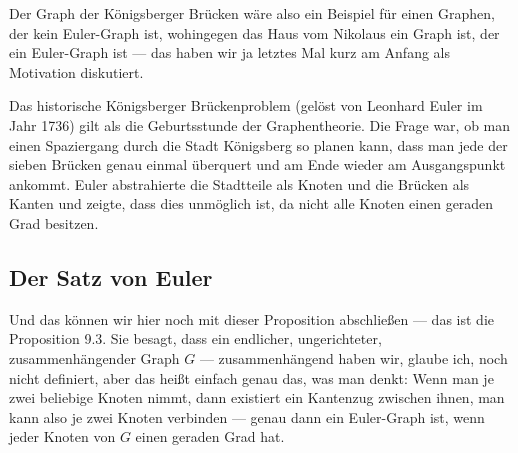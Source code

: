 \begin{spoken-clean}[00:05:40 - 00:06:45]
Der Graph der Königsberger Brücken wäre also ein Beispiel für einen Graphen, der kein Euler-Graph ist, wohingegen das Haus vom Nikolaus ein Graph ist, der ein Euler-Graph ist --- das haben wir ja letztes Mal kurz am Anfang als Motivation diskutiert.
\end{spoken-clean}

\begin{didactic-insight}
Das historische Königsberger Brückenproblem (gelöst von Leonhard Euler im Jahr 1736) gilt als die Geburtsstunde der Graphentheorie. Die Frage war, ob man einen Spaziergang durch die Stadt Königsberg so planen kann, dass man jede der sieben Brücken genau einmal überquert und am Ende wieder am Ausgangspunkt ankommt. Euler abstrahierte die Stadtteile als Knoten und die Brücken als Kanten und zeigte, dass dies unmöglich ist, da nicht alle Knoten einen geraden Grad besitzen.
\end{didactic-insight}

\subsection{Der Satz von Euler}

\begin{spoken-clean}[00:06:45 - 00:08:55]
Und das können wir hier noch mit dieser Proposition abschließen --- das ist die Proposition 9.3. Sie besagt, dass ein endlicher, ungerichteter, zusammenhängender Graph $G$ --- zusammenhängend haben wir, glaube ich, noch nicht definiert, aber das heißt einfach genau das, was man denkt: Wenn man je zwei beliebige Knoten nimmt, dann existiert ein Kantenzug zwischen ihnen, man kann also je zwei Knoten verbinden --- genau dann ein Euler-Graph ist, wenn jeder Knoten von $G$ einen geraden Grad hat.
\end{spoken-clean}

\begin{math-stroke}

\end{math-stroke}

